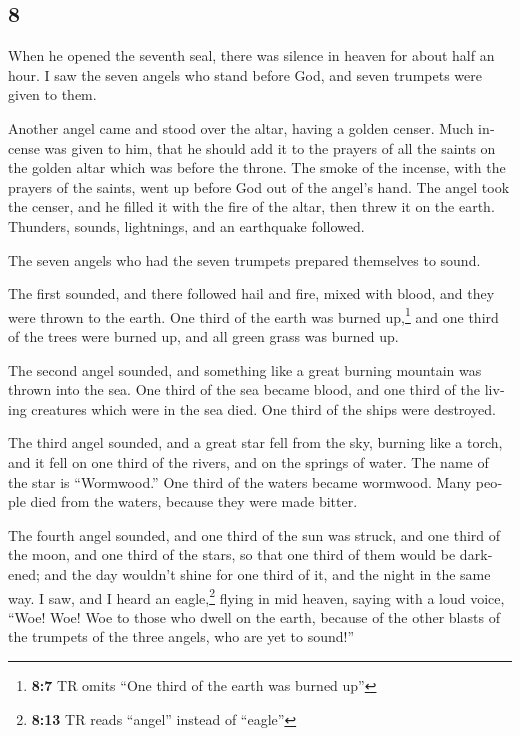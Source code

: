 \begin{paracol}{2}
\switchcolumn
\begin{otherlanguage}{english}

\hypertarget{section-15}{%
\section{8}\label{section-15}}

 When he opened the seventh seal, there was silence in
heaven for about half an hour.  I saw the seven angels who
stand before God, and seven trumpets were given to them.

 Another angel came and stood over the altar, having a
golden censer. Much incense was given to him, that he should add it to
the prayers of all the saints on the golden altar which was before the
throne.  The smoke of the incense, with the prayers of the
saints, went up before God out of the angel's hand.  The
angel took the censer, and he filled it with the fire of the altar, then
threw it on the earth. Thunders, sounds, lightnings, and an earthquake
followed.

 The seven angels who had the seven trumpets prepared
themselves to sound.

 The first sounded, and there followed hail and fire,
mixed with blood, and they were thrown to the earth. One third of the
earth was burned up,\footnote{\textbf{8:7} TR omits ``One third of the
  earth was burned up''} and one third of the trees were burned up, and
all green grass was burned up.

 The second angel sounded, and something like a great
burning mountain was thrown into the sea. One third of the sea became
blood,  and one third of the living creatures which were
in the sea died. One third of the ships were destroyed.

 The third angel sounded, and a great star fell from the
sky, burning like a torch, and it fell on one third of the rivers, and
on the springs of water.  The name of the star is
``Wormwood.'' One third of the waters became wormwood. Many people died
from the waters, because they were made bitter.

 The fourth angel sounded, and one third of the sun was
struck, and one third of the moon, and one third of the stars, so that
one third of them would be darkened; and the day wouldn't shine for one
third of it, and the night in the same way.  I saw, and I
heard an eagle,\footnote{\textbf{8:13} TR reads ``angel'' instead of
  ``eagle''} flying in mid heaven, saying with a loud voice, ``Woe! Woe!
Woe to those who dwell on the earth, because of the other blasts of the
trumpets of the three angels, who are yet to sound!''


\end{otherlanguage}
\end{paracol}
